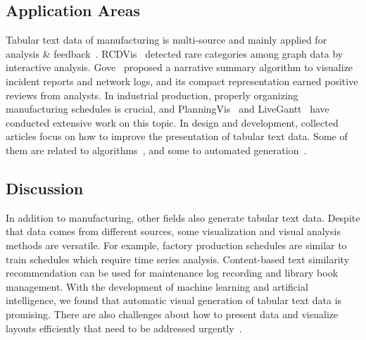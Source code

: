 \documentclass[a4paper,fleqn]{cas-dc}
\begin{document}
\subsection{Application Areas}
Tabular text data of manufacturing is multi-source and mainly applied for analysis \& feedback~\cite{Gove,Mei2019,sun2019planningvis,Wang2018}.
RCDVis~\cite{Qian2022} detected rare categories among graph data  by interactive analysis.
Gove~\cite{Gove} proposed a narrative summary algorithm to visualize incident reports and network logs, and its compact representation earned positive reviews from analysts.
In industrial production, properly organizing manufacturing schedules is crucial, and PlanningVis~\cite{sun2019planningvis} and LiveGantt~\cite{Jo2014} have conducted extensive work on this topic.
In design and development, collected articles focus on how to improve the presentation of tabular text data. Some of them are related to algorithms~\cite{Bartram2022,McNutt2021,Mei2019}, and some to automated generation~\cite{Liu2021,wang2019datashot}.

\subsection{Discussion}
In addition to manufacturing, other fields also generate tabular text data. Despite that data comes from different sources, some visualization and visual analysis methods are versatile.
For example, factory production schedules are similar to train schedules which require time series analysis. Content-based text similarity recommendation can be used for maintenance log recording and library book management.
With the development of machine learning and artificial intelligence, we found that automatic visual generation of tabular text data is promising.
There are also challenges about how to present data and visualize layouts efficiently that need to be addressed urgently~\cite{Blumenschein2018,Mei2019}.
\end{document}
